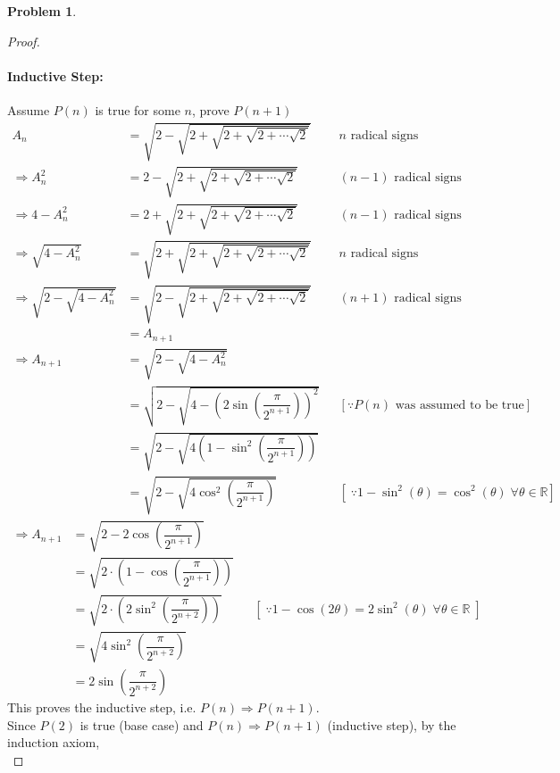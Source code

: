 \documentclass[14]{article}
\theoremstyle{definition}
\newtheorem{prob}{Problem}
\begin{document}
\begin{prob}
\begin{proof}
\paragraph{Inductive Step:} Assume $P(n)$ is true for some $n$, prove $P(n + 1)$\\
\begin{align*}
A_n &= \sqrt{2 - \sqrt{2 + \sqrt{2 + \sqrt{2 + \cdots \sqrt{2}}}}} && n \text{ radical signs}\\
\Rightarrow A_n ^2 &= 2 - \sqrt{2 + \sqrt{2 + \sqrt{2 + \cdots \sqrt{2}}}} && (n-1) \text{ radical signs}\\
\Rightarrow 4 - A_n^2 &= 2 + \sqrt{2 + \sqrt{2 + \sqrt{2 + \cdots \sqrt{2}}}} && (n-1) \text{ radical signs}\\
\Rightarrow \sqrt{4 - A_n^2} &= \sqrt{2 + \sqrt{2 + \sqrt{2 + \sqrt{2 + \cdots \sqrt{2}}}}} && n \text{ radical signs}\\
\Rightarrow \sqrt{2 - \sqrt{4 - A_n^2}} &= \sqrt{2 - \sqrt{2 + \sqrt{2 + \sqrt{2 + \cdots \sqrt{2}}}}} && (n+1) \text{ radical signs}\\
&= A_{n+1}\\
\Rightarrow A_{n + 1} &= \sqrt{2 - \sqrt{4 - A_n^2}}\\
&= \sqrt{2 - \sqrt{4 - \left(2 \sin\left(\dfrac{\pi}{2^{n+1}}\right)\right)^2}} && \left[ \because P(n) \text{ was assumed to be true} \right]\\
&= \sqrt{2 - \sqrt{4 \left( 1 - \sin^2\left( \dfrac{\pi}{2^{n + 1}} \right) \right)}}\\
&= \sqrt{2 - \sqrt{4 \cos^2\left( \dfrac{\pi}{2^{n+1}} \right)}} && \left[\;\because 1 - \sin^2 (\theta) = \cos^2(\theta) \; \forall \theta \in \mathbb{R}\right]
\end{align*}
\pagebreak
\begin{align*}
\Rightarrow A_{n + 1} &= \sqrt{2 - 2 \cos\left( \dfrac{\pi}{2^{n+1}} \right)}\\
&= \sqrt{2\cdot \left(1 - \cos\left( \dfrac{\pi}{2^{n+1}} \right)\right)}\\
&= \sqrt{2\cdot \left(2 \sin^2\left( \dfrac{\pi}{2^{n+2}} \right)\right)} && \left[\;\because 1 - \cos(2\theta) = 2\sin^2(\theta) \; \forall \theta \in \mathbb{R}\;\right]\\
&= \sqrt{4\sin^2\left(\dfrac{\pi}{2^{n+2}}\right)}\\
&= 2\sin\left(\dfrac{\pi}{2^{n+2}}\right)
\end{align*}
This proves the inductive step, i.e. $P(n) \Rightarrow P(n+1)$.\\
Since $P(2)$ is true (base case) and $P(n) \Rightarrow P(n+1)$ (inductive step), by the induction axiom,\\

\end{proof}
\end{prob}
\end{document}
